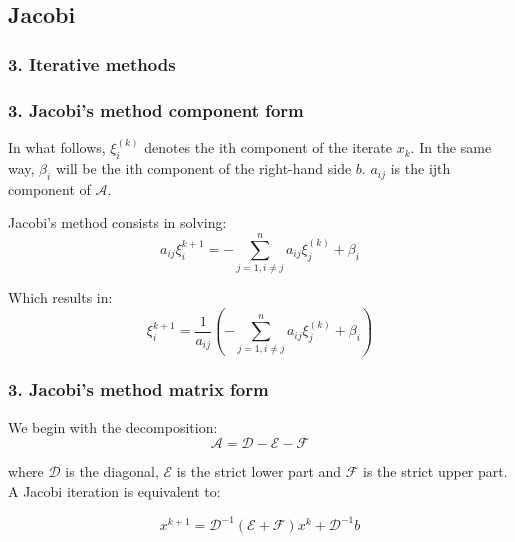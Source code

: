 \subsection{Jacobi}

\begin{frame}
		\frametitle{\textbf{3. Iterative methods}}
	
	
		
\end{frame}

\begin{frame} 
\frametitle{\textbf{3. Jacobi's method component form}}

In what follows, $\xi_i^{(k)}$ denotes the ith component of the iterate $x_k$. In the same way, $\beta_i$ will be the ith component of the right-hand side $b$. $a_{ij}$ is the ijth component of $\mathcal{A}$.

Jacobi's method consists in solving:
\[
a_{ij} \xi_i^{k+1} = - \sum_{j=1,i\neq j}^n a_{ij} \xi_j^{(k)} + \beta_i
\]

Which results in:
\[
 \xi_i^{k+1} = \frac{1}{a_{ij}} \left( - \sum_{j=1,i\neq j}^n a_{ij} \xi_j^{(k)} + \beta_i \right)
\]

\end{frame}

\begin{frame} 
	\frametitle{\textbf{3. Jacobi's method matrix form}}
	
	We begin with the decomposition:
	\[
	\mathcal{A} = \mathcal{D} - \mathcal{E}-\mathcal{F}
	\]
	
	where $\mathcal{D}$ is the diagonal, $\mathcal{E}$ is the strict lower part and $\mathcal{F}$ is the strict upper part. A Jacobi iteration is equivalent to:
	
	\[
	x^{k+1} = \mathcal{D}^{-1} (\mathcal{E} + \mathcal{F})x^{k} + \mathcal{D}^{-1} b
	\]
\end{frame}

